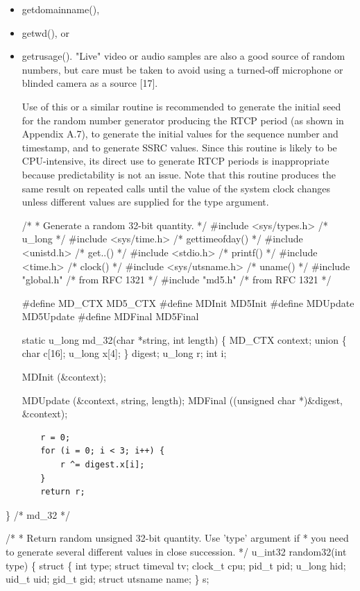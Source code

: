 \documentclass{article}
\begin{document}
\begin{itemize}
\item getdomainname(),
\item getwd(), or
\item getrusage().
"Live" video or audio samples are also a good source of random numbers, but care must be taken to avoid using a turned-off microphone or blinded camera as a source [17].

Use of this or a similar routine is recommended to generate the initial seed for the random number generator producing the RTCP period (as shown in Appendix A.7), to generate the initial values for the sequence number and timestamp, and to generate SSRC values. Since this routine is likely to be CPU-intensive, its direct use to generate RTCP periods is inappropriate because predictability is not an issue.  Note that this routine produces the same result on repeated calls until the value of the system clock changes unless different values are supplied for the type argument.

/* * Generate a random 32-bit quantity. */ \#include <sys/types.h>   /* u\_long */ \#include <sys/time.h>    /* gettimeofday() */ \#include <unistd.h>      /* get..() */ \#include <stdio.h>       /* printf() */ \#include <time.h>        /* clock() */ \#include <sys/utsname.h> /* uname() */ \#include "global.h"      /* from RFC 1321 */ \#include "md5.h"         /* from RFC 1321 */

\#define MD\_CTX MD5\_CTX \#define MDInit MD5Init \#define MDUpdate MD5Update \#define MDFinal MD5Final

static u\_long md\_32(char *string, int length) \{ MD\_CTX context; union \{ char   c[16]; u\_long x[4]; \} digest; u\_long r; int i;

MDInit (\&context);

MDUpdate (\&context, string, length); MDFinal ((unsigned char *)\&digest, \&context);

\end{itemize}
\begin{verbatim}
       r = 0;
       for (i = 0; i < 3; i++) {
           r ^= digest.x[i];
       }
       return r;
\end{verbatim}

\}                               /* md\_32 */

/* * Return random unsigned 32-bit quantity.  Use 'type' argument if * you need to generate several different values in close succession. */ u\_int32 random32(int type) \{ struct \{ int     type; struct  timeval tv; clock\_t cpu; pid\_t   pid; u\_long  hid; uid\_t   uid; gid\_t   gid; struct  utsname name; \} s;
\end{document}
